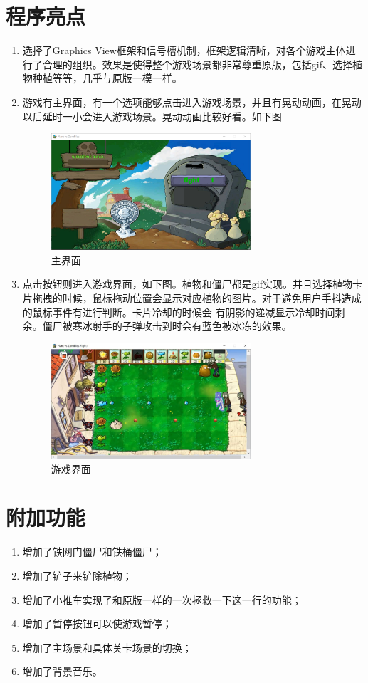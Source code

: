 \documentclass[12pt,a4paper,UTF8]{article}
\begin{document}
\section{程序亮点}
\begin{enumerate}
  \item 选择了Graphics View框架和信号槽机制，框架逻辑清晰，对各个游戏主体进行了合理的组织。效果是使得整个游戏场景都非常尊重原版，包括gif、选择植物种植等等，几乎与原版一模一样。
  \item 游戏有主界面，有一个选项能够点击进入游戏场景，并且有晃动动画，在晃动以后延时一小会进入游戏场景。晃动动画比较好看。如下图
  \begin{figure}[H]
    \centering
  \includegraphics[width=0.7\textwidth]{figure/start.png}
  \caption{主界面}
  \end{figure}
  \item 点击按钮则进入游戏界面，如下图。植物和僵尸都是gif实现。并且选择植物卡片拖拽的时候，鼠标拖动位置会显示对应植物的图片。对于避免用户手抖造成的鼠标事件有进行判断。卡片冷却的时候会
  有阴影的递减显示冷却时间剩余。僵尸被寒冰射手的子弹攻击到时会有蓝色被冰冻的效果。
  \begin{figure}[H]
    \centering
  \includegraphics[width=0.7\textwidth]{figure/game.jpg}
  \caption{游戏界面}
\end{figure}
\end{enumerate}
 
\section{附加功能}
\begin{enumerate}
  \item 增加了铁网门僵尸和铁桶僵尸；
  \item 增加了铲子来铲除植物；
  \item 增加了小推车实现了和原版一样的一次拯救一下这一行的功能；
  \item 增加了暂停按钮可以使游戏暂停；
  \item 增加了主场景和具体关卡场景的切换；
  \item 增加了背景音乐。
\end{enumerate}
  
\end{document}
